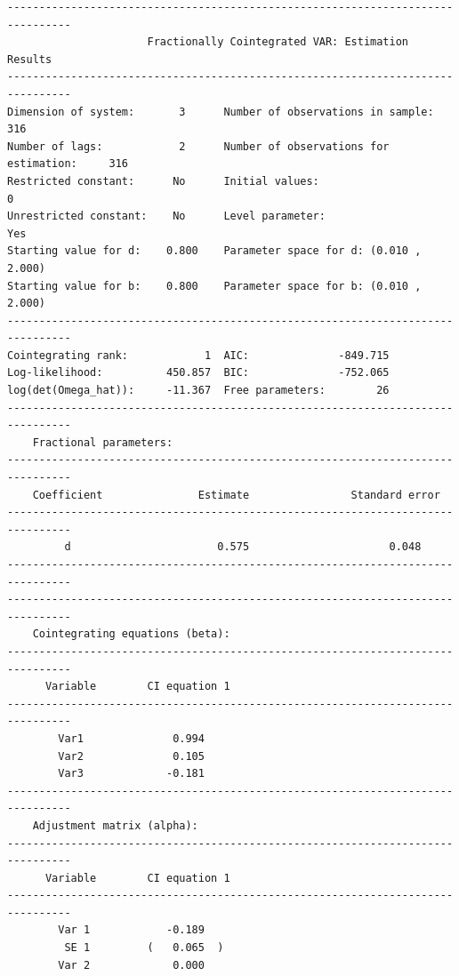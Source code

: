 \documentclass[article]{jss}
\begin{document}
\begin{verbatim}
--------------------------------------------------------------------------------
                      Fractionally Cointegrated VAR: Estimation Results                              
--------------------------------------------------------------------------------
Dimension of system:       3      Number of observations in sample:          316 
Number of lags:            2      Number of observations for estimation:     316 
Restricted constant:      No      Initial values:                              0
Unrestricted constant:    No      Level parameter:                           Yes
Starting value for d:    0.800    Parameter space for d: (0.010 , 2.000) 
Starting value for b:    0.800    Parameter space for b: (0.010 , 2.000) 
--------------------------------------------------------------------------------
Cointegrating rank:            1  AIC:              -849.715 
Log-likelihood:          450.857  BIC:              -752.065 
log(det(Omega_hat)):     -11.367  Free parameters:        26 
--------------------------------------------------------------------------------
    Fractional parameters:                                                                             
--------------------------------------------------------------------------------
    Coefficient               Estimate                Standard error 
--------------------------------------------------------------------------------
         d                       0.575                      0.048                
--------------------------------------------------------------------------------
--------------------------------------------------------------------------------
    Cointegrating equations (beta):                                                                  
--------------------------------------------------------------------------------
      Variable        CI equation 1  
--------------------------------------------------------------------------------
        Var1              0.994     
        Var2              0.105     
        Var3             -0.181     
--------------------------------------------------------------------------------
    Adjustment matrix (alpha):                                                                         
--------------------------------------------------------------------------------
      Variable        CI equation 1  
--------------------------------------------------------------------------------
        Var 1            -0.189     
         SE 1         (   0.065  )  
        Var 2             0.000     

\end{verbatim}
\end{document}
